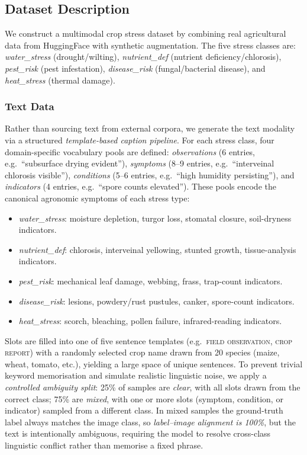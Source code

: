 \documentclass[conference]{IEEEtran}
\begin{document}
\subsection{Dataset Description}

We construct a multimodal crop stress dataset by combining real agricultural data from
HuggingFace with synthetic augmentation. The five stress classes are: \textit{water\_stress}
(drought/wilting), \textit{nutrient\_def} (nutrient deficiency/chlorosis),
\textit{pest\_risk} (pest infestation), \textit{disease\_risk} (fungal/bacterial disease),
and \textit{heat\_stress} (thermal damage).

\subsubsection{Text Data}

Rather than sourcing text from external corpora, we generate the text modality via a
structured \emph{template-based caption pipeline}.  For each stress class, four
domain-specific vocabulary pools are defined: \emph{observations} (6 entries, e.g.\
``subsurface drying evident''), \emph{symptoms} (8--9 entries, e.g.\ ``interveinal
chlorosis visible''), \emph{conditions} (5--6 entries, e.g.\ ``high humidity
persisting''), and \emph{indicators} (4 entries, e.g.\ ``spore counts elevated'').
These pools encode the canonical agronomic symptoms of each stress type:

\begin{itemize}
  \item \textit{water\_stress}: moisture depletion, turgor loss, stomatal closure,
        soil-dryness indicators.
  \item \textit{nutrient\_def}: chlorosis, interveinal yellowing, stunted growth,
        tissue-analysis indicators.
  \item \textit{pest\_risk}: mechanical leaf damage, webbing, frass, trap-count
        indicators.
  \item \textit{disease\_risk}: lesions, powdery/rust pustules, canker, spore-count
        indicators.
  \item \textit{heat\_stress}: scorch, bleaching, pollen failure, infrared-reading
        indicators.
\end{itemize}

Slots are filled into one of five sentence templates (e.g.\ \textsc{field
observation}, \textsc{crop report}) with a randomly selected crop name drawn from
20 species (maize, wheat, tomato, etc.), yielding a large space of unique sentences.
To prevent trivial keyword memorisation and simulate realistic linguistic noise, we
apply a \emph{controlled ambiguity split}: 25\% of samples are \emph{clear}, with all
slots drawn from the correct class; 75\% are \emph{mixed}, with one or more slots
(symptom, condition, or indicator) sampled from a different class.  In mixed samples
the ground-truth label always matches the image class, so \emph{label--image alignment
is 100\%}, but the text is intentionally ambiguous, requiring the model to resolve
cross-class linguistic conflict rather than memorise a fixed phrase.
\end{document}
